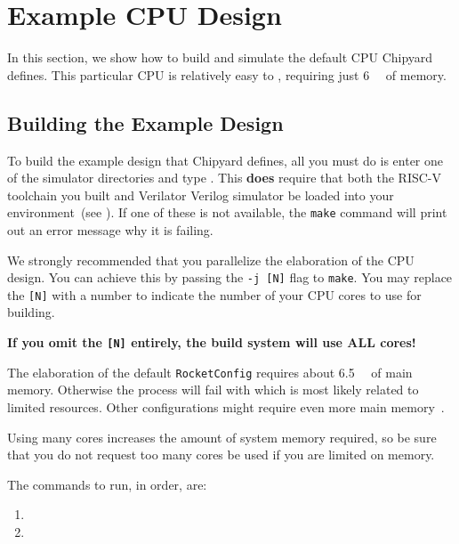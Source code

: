 \section{Example CPU Design}\label{sec:Example_CPU_Design}
In this section, we show how to build and simulate the default CPU Chipyard defines.
This particular CPU is relatively easy to , requiring just \SI{6}{\giga\byte} of memory.

\subsection{Building the Example Design}\label{sec:Building_Example_Design}
To build the example design that Chipyard defines, all you must do is enter one of the simulator directories and type .
This \textbf{does} require that both the RISC-V toolchain you built and Verilator Verilog simulator be loaded into your environment~(see ).
If one of these is not available, the \texttt{make} command will print out an error message why it is failing.

\begin{blackbox}
  We strongly recommended that you parallelize the \gls{elaboration} of the CPU design.
  You can achieve this by passing the \texttt{-j [N]} flag to \texttt{make}.
  You may replace the \texttt{[N]} with a number to indicate the number of your CPU cores to use for building.

  \textbf{If you omit the \texttt{[N]} entirely, the build system will use ALL cores!}

  The \gls{elaboration} of the default \texttt{RocketConfig} requires about \SI{6.5}{\giga\byte} of main memory.
  Otherwise the process will fail with  which is most likely related to limited resources.
  Other configurations might require even more main memory~\cite{chipyard}.

  Using many cores increases the amount of system memory required, so be sure that you do not request too many cores be used if you are limited on memory.
\end{blackbox}

The commands to run, in order, are:
\begin{enumerate}
\item {}
\item {}
\end{enumerate}

